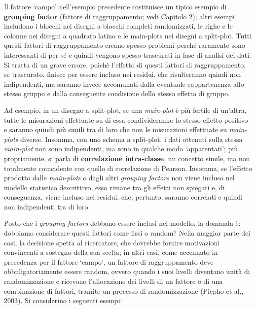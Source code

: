 \documentclass[
  12pt,
]{book}
\begin{document}
Il fattore `campo' nell'esempio precedente costituisce un tipico esempio di \textbf{grouping factor} (fattore di raggruppamento; vedi Capitolo 2); altri esempi includono i blocchi nei disegni a blocchi completi randomizzati, le righe e le colonne nei disegni a quadrato latino e le main-plots nei disegni a split-plot. Tutti questi fattori di raggruppamento creano spesso problemi perché raramente sono interessanti di per sé e quindi vengono spesso trascurati in fase di analisi dei dati. Si tratta di un grave errore, poichè l'effetto di questi fattori di raggruppamento, se trascurato, finisce per essere incluso nei residui, che risulteranno quindi non indipendenti, ma saranno invece accomunati dalla eventuale cappartenenza allo stesso gruppo e dalla conseguente condisione dello stesso effetto di gruppo.

Ad esempio, in un disegno a split-plot, se una \emph{main-plot} è più fertile di un'altra, tutte le misurazioni effettuate su di essa condivideranno lo stesso effetto positivo e saranno quindi più simili tra di loro che non le misurazioni effettuate su \emph{main-plots} diverse. Insomma, con uno schema a split-plot, i dati ottenuti sulla stessa \emph{main-plot} non sono indipendenti, ma sono in qualche modo `apparentati'; più propriamente, si parla di \textbf{correlazione intra-classe}, un concetto simile, ma non totalmente coincidente con quello di correlazione di Pearson. Insomma, se l'effetto prodotto dalle \emph{main-plots} o dagli altri \emph{grouping factors} non viene incluso nel modello statistico descrittivo, esso rimane tra gli effetti non spiegati e, di conseguenza, viene incluso nei residui, che, pertanto, saranno correlati e quindi non indipendenti tra di loro.

Posto che i \emph{grouping factors} debbano essere inclusi nel modello, la domanda è: dobbiamo considerare questi fattori come fissi o random? Nella maggior parte dei casi, la decisione spetta al ricercatore, che dovrebbe fornire motivazioni convincenti a sostegno della sua scelta; in altri casi, come accennato in precedenza per il fattore `campo', un fattore di raggruppamento deve obbnligatoriamente essere random, ovvero quando i suoi livelli diventano unità di randomizzazione e ricevono l'allocazione dei livelli di un fattore o di una combinazione di fattori, tramite un processo di randomizzazione (Piepho et al., 2003). Si considerino i seguenti esempi:
\end{document}
